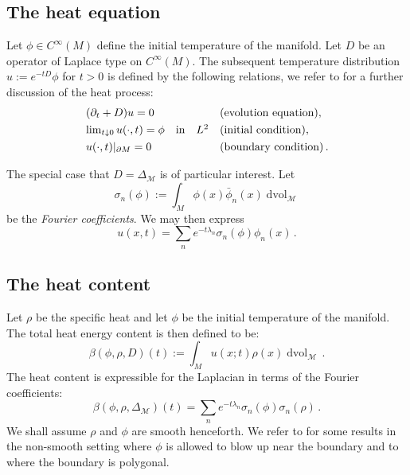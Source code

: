 \documentclass{amsart}
\begin{document}
\subsection{The heat equation}
Let $\phi\in C^\infty(M)$ define the
initial temperature of the manifold. Let
$D$ be an operator of Laplace type on $C^\infty(M)$. The subsequent temperature distribution
$u:=e^{-tD}\phi$ for $t>0$ is defined by the following relations, we refer to
\cite{CaJa86} for a further discussion of the heat process:
\begin{equation}\label{eqn-1.b}\begin{array}{ll}
(\partial_t+D)u=0&\text{(evolution equation)},\\
\lim_{t\downarrow0}u(\cdot,t)=\phi\quad\text{in}\quad L^2&\text{(initial condition)},\vphantom{\vrule height 12pt}\\
u(\cdot,t)|_{\partial M}=0&\text{(boundary condition)}\,.\vphantom{\vrule height 12pt}
\end{array}\end{equation}

The special case that $D=\Delta_{\mathcal{M}}$ is of particular interest. Let
$$\sigma_n(\phi):=\int_M\phi(x)\bar\phi_n(x)\operatorname{dvol}_{\mathcal{M}}$$
be the {\it Fourier coefficients}. We may then express
$$
u(x,t)=\sum_ne^{-t\lambda_n}\sigma_n(\phi)\phi_n(x)\,.$$

\subsection{The heat content}
Let $\rho$ be the specific heat and let $\phi$ be the initial temperature of the manifold. The total heat energy content is then defined to be:
\begin{equation}\label{eqn-1.c}
\beta(\phi,\rho,D)(t):=\int_Mu(x;t)\rho(x)\operatorname{dvol}_{\mathcal{M}}\,.
\end{equation}
The heat content is expressible for the Laplacian in terms of the Fourier
coefficients:
$$
\beta(\phi,\rho,\Delta_{\mathcal{M}})(t)=\sum_ne^{-t\lambda_n}\sigma_n(\phi)\sigma_n(\rho)\,.
$$
We shall assume
$\rho$ and $\phi$ are smooth henceforth. We refer to \cite{BeGiSe08} for some results in the non-smooth
setting where
$\phi$ is allowed to blow up near the boundary and to \cite{BeSr90} where the boundary is polygonal. 
\end{document}
